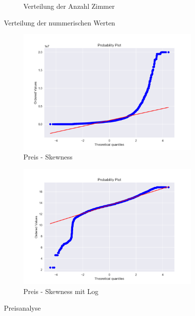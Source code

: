 \begin{figure}[h]
\begin{subfigure}{.5\textwidth}
  \caption{Verteilung der Anzahl Zimmer}
\end{subfigure}
\caption{Verteilung der nummerischen Werten}
\end{figure}

\begin{figure}[H]
\begin{subfigure}{.5\textwidth}
  \centering
  \includegraphics[width=\linewidth]{images/anhang/analysis/skewness.png}
  \caption{Preis - Skewness}
\end{subfigure}
\begin{subfigure}{.5\textwidth}
  \centering
  \includegraphics[width=\linewidth]{images/anhang/analysis/log_skewness.png}
  \caption{Preis - Skewness mit Log} 
\end{subfigure}
\caption{Preisanalyse}
\end{figure}


